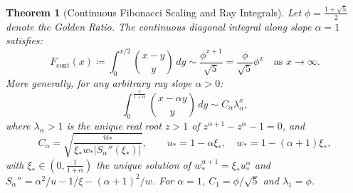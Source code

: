 \documentclass[11pt,a4paper]{article}
\theoremstyle{plain}
\newtheorem{theorem}{Theorem}[section]
\theoremstyle{definition}
\theoremstyle{remark}
\numberwithin{equation}{section}
\begin{document}
\begin{theorem}[Continuous Fibonacci Scaling and Ray Integrals]
\label{thm:fibonacci}
Let $\phi = \frac{1+\sqrt{5}}{2}$ denote the Golden Ratio. The continuous diagonal integral along slope $\alpha = 1$ satisfies:
\begin{equation}
F_{\text{cont}}(x) \coloneqq \int_0^{x/2} \binom{x-y}{y}\,dy \sim \frac{\phi^{x+1}}{\sqrt{5}} = \frac{\phi}{\sqrt{5}}\phi^x \quad \text{as } x \to \infty.
\end{equation}
More generally, for any arbitrary ray slope $\alpha > 0$:
\begin{equation}
\int_0^{\frac{x}{1+\alpha}} \binom{x-\alpha y}{y}\,dy \sim C_\alpha \lambda_\alpha^x,
\end{equation}
where $\lambda_\alpha > 1$ is the unique real root $z > 1$ of $z^{\alpha+1} - z^\alpha - 1 = 0$, and
\begin{equation}
\label{eq:ray_constant}
C_\alpha = \sqrt{\frac{u_*}{\xi_* w_* |S_\alpha''(\xi_*)|}}, \qquad u_* = 1 - \alpha\xi_*, \quad w_* = 1 - (\alpha+1)\xi_*,
\end{equation}
with $\xi_* \in (0, \frac{1}{1+\alpha})$ the unique solution of $w_*^{\alpha+1} = \xi_* u_*^\alpha$ and $S_\alpha'' = \alpha^2/u - 1/\xi - (\alpha+1)^2/w$. For $\alpha = 1$, $C_1 = \phi/\sqrt5$ and $\lambda_1 = \phi$.
\end{theorem}
\end{document}
